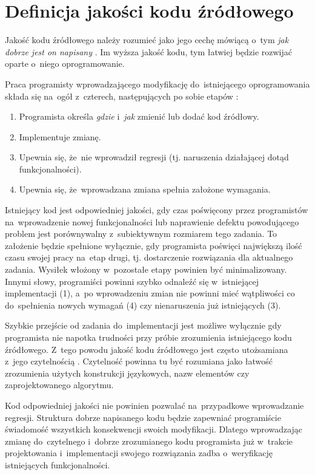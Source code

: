 \documentclass[twoside]{praca}
\begin{document}
\section{Definicja jakości kodu źródłowego}

Jakość kodu źródłowego należy rozumieć jako jego cechę mówiącą o~tym \textit{jak dobrze jest on napisany} \cite{baggen2012standardized}. Im wyższa jakość kodu, tym łatwiej będzie rozwijać oparte o~niego oprogramowanie. 

Praca programisty wprowadzającego modyfikację do~istniejącego oprogramowania składa się na~ogół z~czterech, następujących po sobie etapów \cite{baggen2012standardized}:

\begin{enumerate}
    \item Programista określa \textit{gdzie} i~\textit{jak} zmienić  lub dodać kod źródłowy.
    \item Implementuje zmianę.
    \item Upewnia się, że~nie wprowadził regresji (tj. naruszenia działającej dotąd funkcjonalności).
    \item Upewnia się, że~wprowadzana zmiana spełnia założone wymagania.
\end{enumerate}

Istniejący kod jest odpowiedniej jakości, gdy czas poświęcony przez programistów na~wprowadzenie nowej funkcjonalności lub naprawienie defektu powodującego problem jest porównywalny z~subiektywnym rozmiarem tego zadania. To założenie będzie spełnione wyłącznie, gdy programista poświęci największą ilość czasu swojej pracy na~etap drugi, tj. dostarczenie rozwiązania dla aktualnego zadania. Wysiłek włożony w~pozostałe etapy powinien być minimalizowany. Innymi słowy, programiści powinni szybko odnaleźć się w~istniejącej implementacji (1), a~po wprowadzeniu zmian nie powinni mieć wątpliwości co do~spełnienia nowych wymagań (4) czy nienaruszenia już istniejących (3).

Szybkie przejście od zadania do~implementacji jest możliwe wyłącznie gdy programista nie napotka trudności przy próbie zrozumienia istniejącego kodu źródłowego. Z~tego powodu jakość kodu źródłowego jest często utożsamiana z~jego czytelnością \cite{buse2010learning}. Czytelność powinna tu być rozumiana jako łatwość zrozumienia użytych konstrukcji językowych, nazw elementów czy zaprojektowanego algorytmu.

Kod odpowiedniej jakości nie powinien pozwalać na~przypadkowe wprowadzanie regresji. Struktura dobrze napisanego kodu będzie zapewniać programiście świadomość wszystkich konsekwencji swoich modyfikacji. Dlatego wprowadzając zmianę do~czytelnego i~dobrze zrozumianego kodu programista już w~trakcie projektowania i~implementacji swojego rozwiązania zadba o~weryfikację istniejących funkcjonalności.
\end{document}
